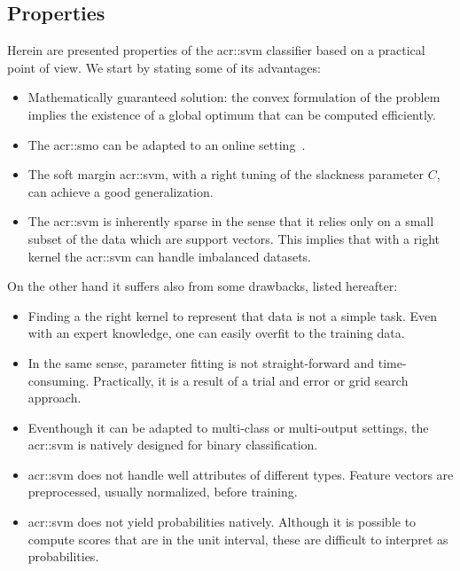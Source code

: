     \subsection{Properties}
        Herein are presented properties of the \gls{acr::svm} classifier based on a practical point of view.
        We start by stating some of its advantages:
        \begin{itemize}
            \item Mathematically guaranteed solution: the convex formulation of the problem implies the existence of a global optimum that can be computed efficiently.
            \item The \gls{acr::smo} can be adapted to an online setting~\parencite{bordes2005fast}.
            \item The soft margin \gls{acr::svm}, with a right tuning of the slackness parameter $C$, can achieve a good generalization.
            \item The \gls{acr::svm} is inherently sparse in the sense that it relies only on a small subset of the data which are support vectors.
                    This implies that with a right kernel the \gls{acr::svm} can handle imbalanced datasets.
        \end{itemize}
        On the other hand it suffers also from some drawbacks, listed hereafter:
        \begin{itemize}
            \item Finding a the right kernel to represent that data is not a simple task.
                    Even with an expert knowledge, one can easily overfit to the training data.
            \item In the same sense, parameter fitting is not straight-forward and time-consuming.
                    Practically, it is a result of a trial and error or grid search approach.
            \item Eventhough it can be adapted to multi-class or multi-output settings, the \gls{acr::svm} is natively designed for binary classification.
            \item \gls{acr::svm} does not handle well attributes of different types.
                    Feature vectors are preprocessed, usually normalized, before training.
            \item \gls{acr::svm} does not yield probabilities natively.
                    Although it is possible to compute scores that are in the unit interval, these are difficult to interpret as probabilities.
        \end{itemize}

